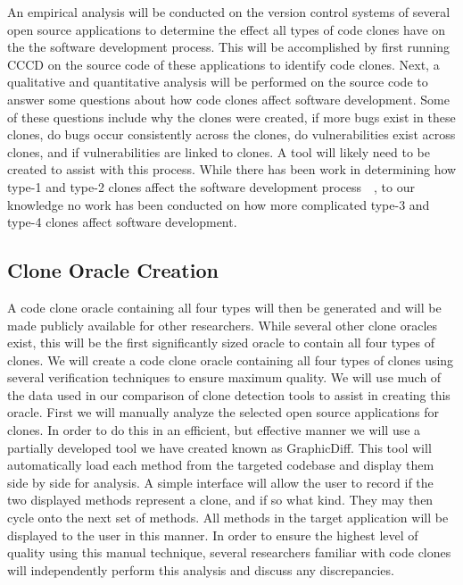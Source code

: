 \documentclass{article}
\begin{document}
An empirical analysis will be conducted on the version control systems of several open source applications to determine the effect all types of code clones have on the the software development process. This will be accomplished by first running CCCD on the source code of these applications to identify code clones. Next, a qualitative and quantitative analysis will be performed on the source code to answer some questions about how code clones affect software development. Some of these questions include why the clones were created, if more bugs exist in these clones, do bugs occur consistently across the clones, do vulnerabilities exist across clones, and if vulnerabilities are linked to clones. A tool will likely need to be created to assist with this process. While there has been work in determining how type-1 and type-2 clones affect the software development process~\cite{Juergens:2009:CCM:1555001.1555062}~\cite{Jarzabek:2010:CHM:1808901.1808911}, to our knowledge no work has been conducted on how more complicated type-3 and type-4 clones affect software development.




\subsection{Clone Oracle Creation}

A code clone oracle containing all four types will then be generated and will be made publicly available for other researchers. While several other clone oracles exist, this will be the first significantly sized oracle to contain all four types of clones. We will create a code clone oracle containing all four types of clones using several verification techniques to ensure maximum quality. We will use much of the data used in our comparison of clone detection tools to assist in creating this oracle. First we will manually analyze the selected open source applications for clones. In order to do this in an efficient, but effective manner we will use a partially developed tool we have created known as GraphicDiff. This tool will automatically load each method from the targeted codebase and display them side by side for analysis. A simple interface will allow the user to record if the two displayed methods represent a clone, and if so what kind. They may then cycle onto the next set of methods. All methods in the target application will be displayed to the user in this manner. In order to ensure the highest level of quality using this manual technique, several researchers familiar with code clones will independently perform this analysis and discuss any discrepancies.
\end{document}
